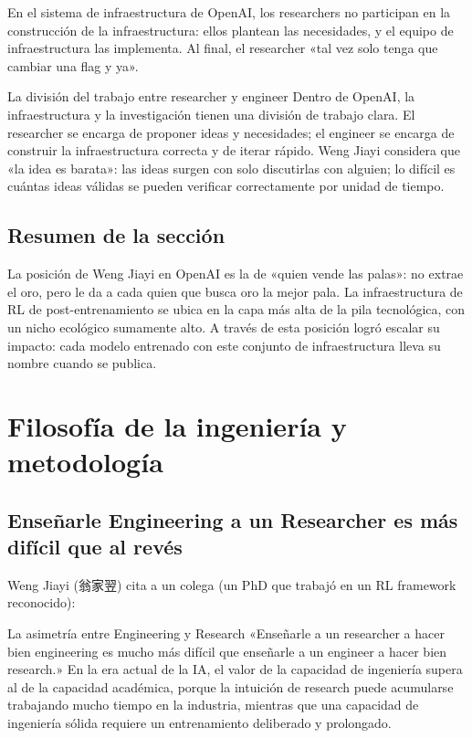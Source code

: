 \documentclass[a4paper]{article}
\begin{document}
En el sistema de infraestructura de OpenAI, los researchers no participan en la construcción de la infraestructura: ellos plantean las necesidades, y el equipo de infraestructura las implementa. Al final, el researcher «tal vez solo tenga que cambiar una flag y ya».

\begin{knowledgebox}{La división del trabajo entre researcher y engineer}
Dentro de OpenAI, la infraestructura y la investigación tienen una división de trabajo clara. El researcher se encarga de proponer ideas y necesidades; el engineer se encarga de construir la infraestructura correcta y de iterar rápido. Weng Jiayi considera que «la idea es barata»: las ideas surgen con solo discutirlas con alguien; lo difícil es cuántas ideas válidas se pueden verificar correctamente por unidad de tiempo.
\end{knowledgebox}

\subsection{Resumen de la sección}

La posición de Weng Jiayi en OpenAI es la de «quien vende las palas»: no extrae el oro, pero le da a cada quien que busca oro la mejor pala. La infraestructura de RL de post-entrenamiento se ubica en la capa más alta de la pila tecnológica, con un nicho ecológico sumamente alto. A través de esta posición logró escalar su impacto: cada modelo entrenado con este conjunto de infraestructura lleva su nombre cuando se publica.
\section{Filosofía de la ingeniería y metodología}

\subsection{Enseñarle Engineering a un Researcher es más difícil que al revés}

Weng Jiayi (翁家翌) cita a un colega (un PhD que trabajó en un RL framework reconocido):

\begin{importantbox}{La asimetría entre Engineering y Research}
«Enseñarle a un researcher a hacer bien engineering es mucho más difícil que enseñarle a un engineer a hacer bien research.» En la era actual de la IA, el valor de la capacidad de ingeniería supera al de la capacidad académica, porque la intuición de research puede acumularse trabajando mucho tiempo en la industria, mientras que una capacidad de ingeniería sólida requiere un entrenamiento deliberado y prolongado.
\end{importantbox}
\end{document}
